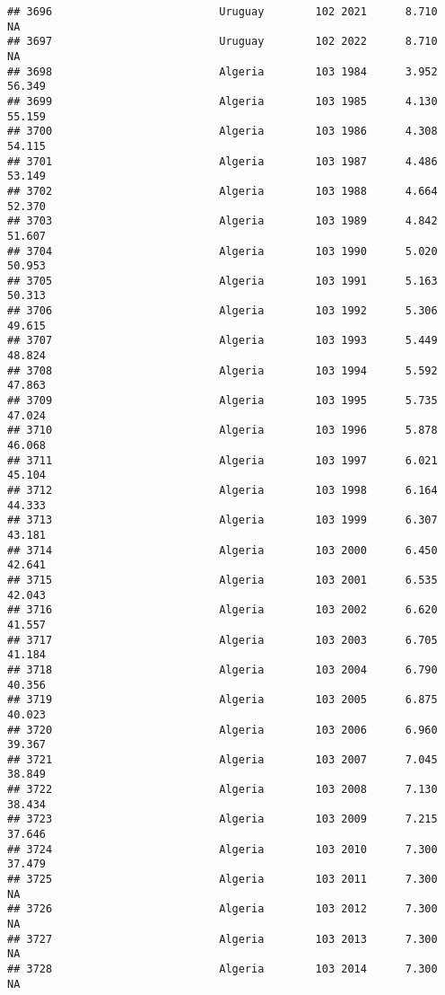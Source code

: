 \documentclass[
]{article}
\begin{document}
\begin{verbatim}
## 3696                          Uruguay        102 2021      8.710         NA
## 3697                          Uruguay        102 2022      8.710         NA
## 3698                          Algeria        103 1984      3.952     56.349
## 3699                          Algeria        103 1985      4.130     55.159
## 3700                          Algeria        103 1986      4.308     54.115
## 3701                          Algeria        103 1987      4.486     53.149
## 3702                          Algeria        103 1988      4.664     52.370
## 3703                          Algeria        103 1989      4.842     51.607
## 3704                          Algeria        103 1990      5.020     50.953
## 3705                          Algeria        103 1991      5.163     50.313
## 3706                          Algeria        103 1992      5.306     49.615
## 3707                          Algeria        103 1993      5.449     48.824
## 3708                          Algeria        103 1994      5.592     47.863
## 3709                          Algeria        103 1995      5.735     47.024
## 3710                          Algeria        103 1996      5.878     46.068
## 3711                          Algeria        103 1997      6.021     45.104
## 3712                          Algeria        103 1998      6.164     44.333
## 3713                          Algeria        103 1999      6.307     43.181
## 3714                          Algeria        103 2000      6.450     42.641
## 3715                          Algeria        103 2001      6.535     42.043
## 3716                          Algeria        103 2002      6.620     41.557
## 3717                          Algeria        103 2003      6.705     41.184
## 3718                          Algeria        103 2004      6.790     40.356
## 3719                          Algeria        103 2005      6.875     40.023
## 3720                          Algeria        103 2006      6.960     39.367
## 3721                          Algeria        103 2007      7.045     38.849
## 3722                          Algeria        103 2008      7.130     38.434
## 3723                          Algeria        103 2009      7.215     37.646
## 3724                          Algeria        103 2010      7.300     37.479
## 3725                          Algeria        103 2011      7.300         NA
## 3726                          Algeria        103 2012      7.300         NA
## 3727                          Algeria        103 2013      7.300         NA
## 3728                          Algeria        103 2014      7.300         NA

\end{verbatim}
\end{document}
